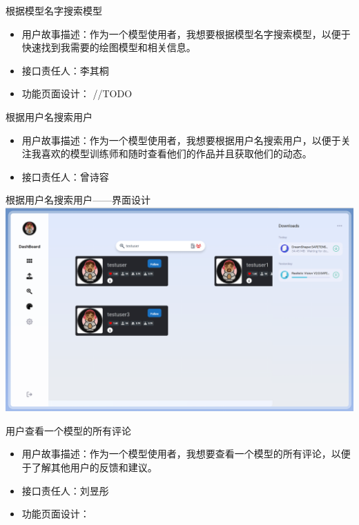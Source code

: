 \begin{frame}{根据模型名字搜索模型}
    \begin{itemize}
        \item 用户故事描述：作为一个模型使用者，我想要根据模型名字搜索模型，以便于快速找到我需要的绘图模型和相关信息。
        \item 接口责任人：李其桐
        \item 功能页面设计： //TODO
    \end{itemize}
\end{frame}

\begin{frame}{根据用户名搜索用户}
    \begin{itemize}
        \item 用户故事描述：作为一个模型使用者，我想要根据用户名搜索用户，以便于关注我喜欢的模型训练师和随时查看他们的作品并且获取他们的动态。
        \item 接口责任人：曾诗容
    \end{itemize}
\end{frame}

\begin{frame}{根据用户名搜索用户——界面设计}
    \includegraphics[width=1\textwidth]{contents/figure/search_user.png}
\end{frame}

\begin{frame}{用户查看一个模型的所有评论}
    \begin{itemize}
        \item 用户故事描述：作为一个模型使用者，我想要查看一个模型的所有评论，以便于了解其他用户的反馈和建议。
        \item 接口责任人：刘昱彤
        \item 功能页面设计： 
    \end{itemize}
\end{frame}

